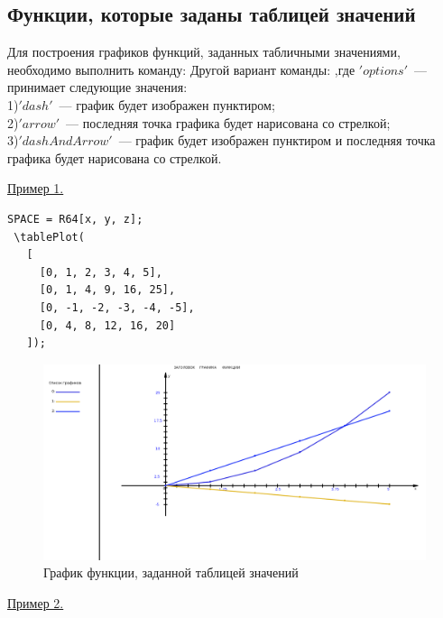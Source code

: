 \subsection{Функции, которые заданы таблицей значений}

Для построения графиков функций, заданных табличными значениями, необходимо выполнить команду:
Другой вариант команды:
,где $'options'$~--- принимает следующие значения:\\
1)$'dash'$~--- график будет изображен пунктиром;\\ 
2)$'arrow'$~---  последняя точка графика будет нарисована со стрелкой;\\
3)$'dashAndArrow'$~--- график будет изображен пунктиром и последняя точка графика будет нарисована со стрелкой.

\underline{Пример 1.}
 
 \vspace*{-2mm}

 \begin{verbatim}
SPACE = R64[x, y, z];
 \tablePlot(
   [
     [0, 1, 2, 3, 4, 5],
     [0, 1, 4, 9, 16, 25],
     [0, -1, -2, -3, -4, -5],
     [0, 4, 8, 12, 16, 20]
   ]);
 \end{verbatim}

\begin{figure}[!h]
 \includegraphics[scale=0.25]{pictures/2_7}
\vspace*{-10mm}
\caption{График функции, заданной таблицей значений}
\label{2_7}
\end{figure}


\underline{Пример 2.}

